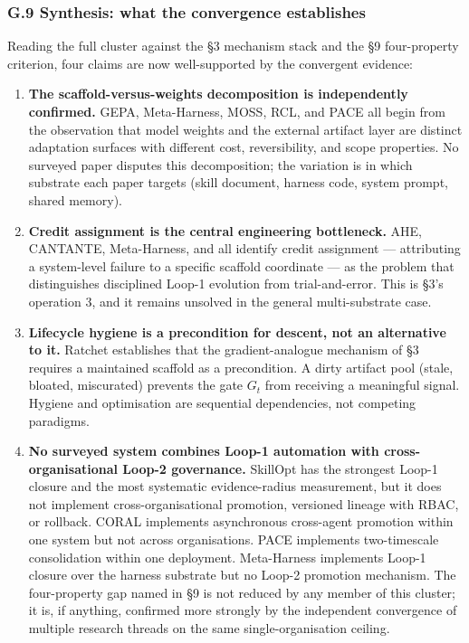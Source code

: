 \subsubsection{G.9 Synthesis: what the convergence
establishes}\label{g.9-synthesis-what-the-convergence-establishes}

Reading the full cluster against the §3 mechanism stack and the §9
four-property criterion, four claims are now well-supported by the
convergent evidence:

\begin{enumerate}
\def\labelenumi{\arabic{enumi}.}
\item
  \textbf{The scaffold-versus-weights decomposition is independently
  confirmed.} GEPA, Meta-Harness, MOSS, RCL, and PACE all begin from the
  observation that model weights and the external artifact layer are
  distinct adaptation surfaces with different cost, reversibility, and
  scope properties. No surveyed paper disputes this decomposition; the
  variation is in which substrate each paper targets (skill document,
  harness code, system prompt, shared memory).
\item
  \textbf{Credit assignment is the central engineering bottleneck.} AHE,
  CANTANTE, Meta-Harness, and \citet{ong2026harnesseval} all identify
  credit assignment --- attributing a system-level failure to a specific
  scaffold coordinate --- as the problem that distinguishes disciplined
  Loop-1 evolution from trial-and-error. This is §3's operation 3, and
  it remains unsolved in the general multi-substrate case.
\item
  \textbf{Lifecycle hygiene is a precondition for descent, not an
  alternative to it.} Ratchet establishes that the gradient-analogue
  mechanism of §3 requires a maintained scaffold as a precondition. A
  dirty artifact pool (stale, bloated, miscurated) prevents the gate
  \(G_t\) from receiving a meaningful signal. Hygiene and optimisation
  are sequential dependencies, not competing paradigms.
\item
  \textbf{No surveyed system combines Loop-1 automation with
  cross-organisational Loop-2 governance.} SkillOpt has the strongest
  Loop-1 closure and the most systematic evidence-radius measurement,
  but it does not implement cross-organisational promotion, versioned
  lineage with RBAC, or rollback. CORAL implements asynchronous
  cross-agent promotion within one system but not across organisations.
  PACE implements two-timescale consolidation within one deployment.
  Meta-Harness implements Loop-1 closure over the harness substrate but
  no Loop-2 promotion mechanism. The four-property gap named in §9 is
  not reduced by any member of this cluster; it is, if anything,
  confirmed more strongly by the independent convergence of multiple
  research threads on the same single-organisation ceiling.
\end{enumerate}

